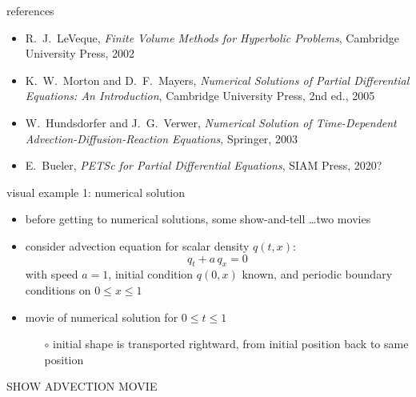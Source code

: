 \documentclass[10pt,hyperref,dvipsnames]{beamer}
\begin{document}
\begin{frame}{references}
\begin{itemize}
\item {\large \alert{R.~J.~LeVeque, \emph{Finite Volume Methods for Hyperbolic Problems}, Cambridge University Press, 2002}}

\bigskip
\item K.~W.~Morton and D.~F.~Mayers, \emph{Numerical Solutions of Partial Differential Equations: An Introduction}, Cambridge University Press, 2nd ed., 2005
\item W.~Hundsdorfer and J.~G.~Verwer, \emph{Numerical Solution of Time-Dependent Advection-Diffusion-Reaction Equations}, Springer, 2003
\item E.~Bueler, \emph{PETSc for Partial Differential Equations}, SIAM Press, 2020?
\end{itemize}
\end{frame}


\begin{frame}{visual example 1: numerical solution}

\begin{itemize}
\item before getting to numerical solutions, some show-and-tell \dots two movies
\item consider advection equation for scalar density $q(t,x)$:
    $$q_t + a \, q_x = 0$$
with speed $a=1$, initial condition $q(0,x)$ known, and periodic boundary conditions on $0\le x \le 1$
\item movie of numerical solution for $0\le t \le 1$
    \begin{itemize}
    \item[$\circ$] initial shape is transported rightward, from initial position back to same position
    \end{itemize}
\end{itemize}

\vspace{10mm}
\begin{center}
\alert{SHOW ADVECTION MOVIE}
\end{center}
\vspace{10mm}

\end{frame}
\end{document}
